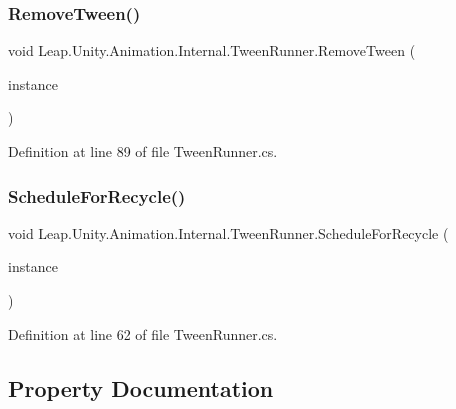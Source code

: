 \subsubsection{\texorpdfstring{RemoveTween()}{RemoveTween()}}
{\footnotesize\ttfamily void Leap.\+Unity.\+Animation.\+Internal.\+Tween\+Runner.\+Remove\+Tween (\begin{DoxyParamCaption}\item[{\mbox{\hyperlink{class_leap_1_1_unity_1_1_animation_1_1_internal_1_1_tween_instance}{Tween\+Instance}}}]{instance }\end{DoxyParamCaption})}



Definition at line 89 of file Tween\+Runner.\+cs.

\mbox{\label{class_leap_1_1_unity_1_1_animation_1_1_internal_1_1_tween_runner_a7328229bb7b6f35e7244084c089ccc58}} 
\subsubsection{\texorpdfstring{ScheduleForRecycle()}{ScheduleForRecycle()}}
{\footnotesize\ttfamily void Leap.\+Unity.\+Animation.\+Internal.\+Tween\+Runner.\+Schedule\+For\+Recycle (\begin{DoxyParamCaption}\item[{\mbox{\hyperlink{class_leap_1_1_unity_1_1_animation_1_1_internal_1_1_tween_instance}{Tween\+Instance}}}]{instance }\end{DoxyParamCaption})}



Definition at line 62 of file Tween\+Runner.\+cs.



\subsection{Property Documentation}
\mbox{\label{class_leap_1_1_unity_1_1_animation_1_1_internal_1_1_tween_runner_a17b39765b051fa31558883ada29043fc}} 
